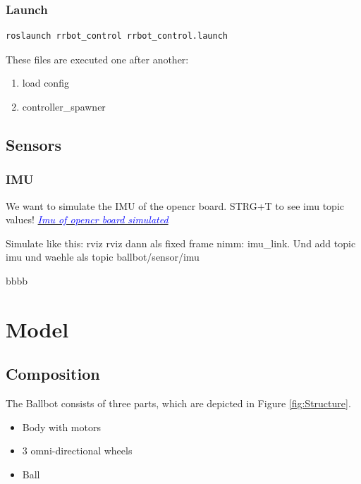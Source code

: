 \documentclass[twoside,colorback,accentcolor=tud4c,11pt]{tudreport}
\newcommand{\mylink}[2] {	\hyperlink{#1}{	\textit{\textcolor{blue}{#2}}}}
\begin{document}
	\subsection{Launch}
	\begin{lstlisting}[style=BashInputStyle]
	roslaunch rrbot_control rrbot_control.launch
	\end{lstlisting}
	
	These files are executed one after another:
	\begin{enumerate}
		\item load config
		\item controller\_spawner
	\end{enumerate}
	
	\section{Sensors}
	\subsection{IMU}
	
		We want to simulate the IMU of the opencr board. STRG+T to see imu topic values!
	\mylink{https://www.youtube.com/watch?v=wXN_7oRHst0}{Imu of opencr board simulated}

	Simulate like this:
	rviz rviz dann als fixed frame nimm: imu\_link. Und add topic imu und waehle als topic ballbot/sensor/imu
	
	bbbb
	
	\chapter{Model}
	
	\section{Composition}
	The Ballbot consists of three parts, which are depicted in Figure \ref{fig:Structure}.
	
	\begin{itemize}
		\item Body with motors
		\item 3 omni-directional wheels
		\item Ball
	\end{itemize}
	
\end{document}
